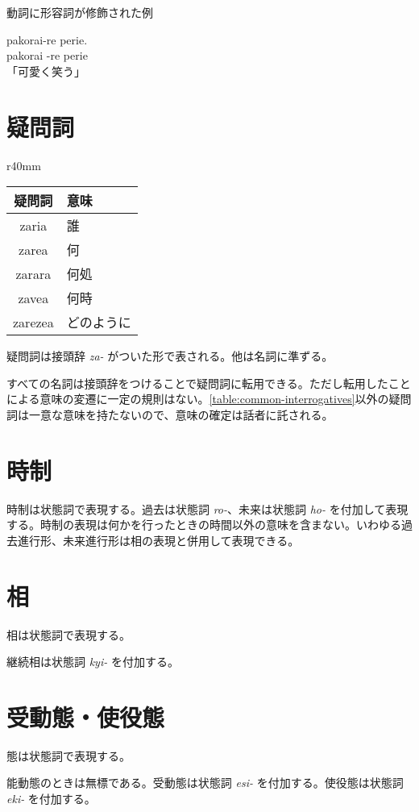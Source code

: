 \begin{itembox}[l]{動詞に形容詞が修飾された例}
    \begin{pindent}
        \noindent
        pakorai-re perie. \vspace{-1mm} \\
        pakorai -re perie \vspace{-1mm} \\
        「可愛く笑う」
    \end{pindent}
\end{itembox}

\section{疑問詞}

\begin{wraptable}[6]{r}{40mm}
    \centering
    \label{table:common-interrogatives}
    \caption{主な疑問詞}
    \begin{tabular}{cl}
        \toprule
        疑問詞 & 意味 \\
        \midrule
        zaria   & 誰 \\
        zarea   & 何 \\
        zarara  & 何処 \\
        zavea   & 何時 \\
        zarezea & どのように \\
        \bottomrule
    \end{tabular}
\end{wraptable}

疑問詞は接頭辞 \emph{za-} がついた形で表される。他は名詞に準ずる。

すべての名詞は接頭辞をつけることで疑問詞に転用できる。ただし転用したことによる意味の変遷に一定の規則はない。\cref{table:common-interrogatives}以外の疑問詞は一意な意味を持たないので、意味の確定は話者に託される。

\section{時制}

時制は状態詞で表現する。過去は状態詞 \emph{ro-}、未来は状態詞 \emph{ho-} を付加して表現する。時制の表現は何かを行ったときの時間以外の意味を含まない。いわゆる過去進行形、未来進行形は相の表現と併用して表現できる。

\section{相}

相は状態詞で表現する。

継続相は状態詞 \emph{kyi-} を付加する。

\section{受動態・使役態}

態は状態詞で表現する。

能動態のときは無標である。受動態は状態詞 \emph{esi-} を付加する。使役態は状態詞 \emph{eki-} を付加する。